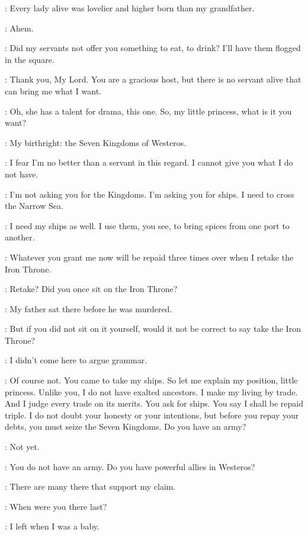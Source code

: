 \SPICEKING: Every lady alive was lovelier and higher born than my grandfather. 

\DAENERYS: Ahem. 

\SPICEKING: Did my servants not offer you something to eat, to drink? I'll have them flogged in the square. 

\DAENERYS: Thank you, My Lord. You are a gracious host, but there is no servant alive that can bring me what I want. 

\SPICEKING: Oh, she has a talent for drama, this one. So, my little princess, what is it you want? 

\DAENERYS: My birthright: the Seven Kingdoms of Westeros. 

\SPICEKING: I fear I'm no better than a servant in this regard. I cannot give you what I do not have. 

\DAENERYS: I'm not asking you for the Kingdoms. I'm asking you for ships. I need to cross the Narrow Sea. 

\SPICEKING: I need my ships as well. I use them, you see, to bring spices from one port to another. 

\DAENERYS: Whatever you grant me now will be repaid three times over when I retake the Iron Throne. 

\SPICEKING: Retake? Did you once sit on the Iron Throne? 

\DAENERYS: My father sat there before he was murdered. 

\SPICEKING: But if you did not sit on it yourself, would it not be correct to say take the Iron Throne? 

\DAENERYS: I didn't come here to argue grammar. 

\SPICEKING: Of course not. You came to take my ships. So let me explain my position, little princess. Unlike you, I do not have exalted ancestors. I make my living by trade. And I judge every trade on its merits. You ask for ships. You say I shall be repaid triple. I do not doubt your honesty or your intentions, but before you repay your debts, you must seize the Seven Kingdoms. Do you have an army? 

\DAENERYS: Not yet. 

\SPICEKING: You do not have an army. Do you have powerful allies in Westeros? 

\DAENERYS: There are many there that support my claim. 

\SPICEKING: When were you there last? 

\DAENERYS: I left when I was a baby. 

